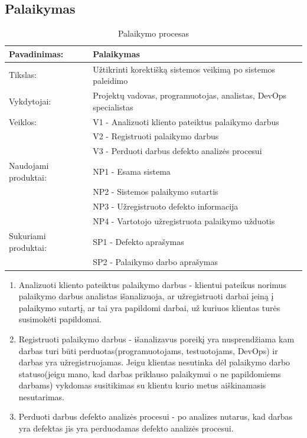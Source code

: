 \documentclass{VUMIFPSkursinis}
\begin{document}
	\subsection{Palaikymas}
	\begin{center}
		\begin{table}[ht]
		\caption{Palaikymo procesas}
		\begin{tabular}{ | l | l | } 
		\hline
		Pavadinimas:         & Palaikymas                              \\ \hline
		Tikslas: 	           & Užtikrinti korektišką sistemos veikimą po sistemos paleidimo\\ \hline
		Vykdytojai:          & Projektų vadovas, programuotojas, analistas, DevOps specialistas                                \\ \hline
		Veiklos:             & V1 - Analizuoti kliento pateiktus palaikymo darbus												\\ 
						             & V2 - Registruoti palaikymo darbus \\ 
									  & V3 - Perduoti darbus defekto analizės procesui																			 \\ 
									 \hline
		Naudojami produktai: & NP1 - Esama sistema \\
						& NP2 - Sistemos palaikymo sutartis \\
						& NP3 - Užregistruoto defekto informacija \\
						& NP4 - Vartotojo užregistruota palaikymo užduotis 																																										 \\ \hline
		Sukuriami produktai: & SP1 - Defekto aprašymas \\
					       & SP2 - Palaikymo darbo aprašymas																											\\ \hline
		\end{tabular}
	\end{table}
		\end{center}

		\begin{enumerate}
			\item{Analizuoti kliento pateiktus palaikymo darbus - klientui pateikus norimus palaikymo darbus analistas išanalizuoja, ar užregistruoti darbai įeiną į palaikymo sutartį, ar tai yra papildomi darbai, už kuriuos klientas turės susimokėti papildomai.}
			\item{Registruoti palaikymo darbus - išanalizavus poreikį yra nusprendžiama kam darbas turi būti perduotas(programuotojams, testuotojams, DevOps) ir darbas yra užregistruojamas. Jeigu klientas nesutinka dėl palaikymo darbo statuso(jeigu mano, kad darbas priklauso palaikymui o ne papildomiems darbams) vykdomas susitikimas su klientu kurio metus aiškinamasis nesutarimas.}
			\item{Perduoti darbus defekto analizės procesui - po analizes nutarus, kad darbas yra defektas jis yra perduodamas defekto analizės procesui.}
		\end{enumerate}
\end{document}
